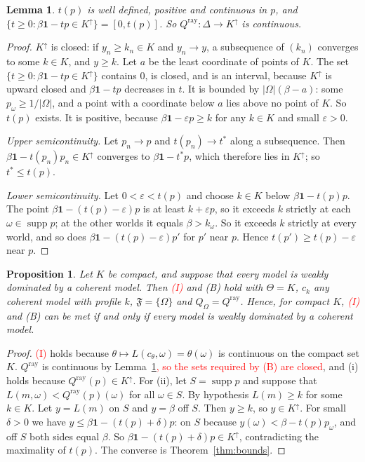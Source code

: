 \documentclass[11pt]{article}
\newtheorem{lemma}[theorem]{Lemma}
\newtheorem{proposition}[theorem]{Proposition}
\theoremstyle{definition}
\theoremstyle{remark}
\newcommand{\F}{\mathfrak F}
\newcommand{\one}{\mathbf 1}
\newcommand{\supp}{\operatorname{supp}}
\begin{document}
\begin{lemma}\label{lem:ray}
$t(p)$ is well defined, positive and continuous in $p$, and $\{t\ge0:\beta\one-tp\in K^\uparrow\}=[0,t(p)]$. So $Q^{\mathrm{ray}}:\Delta\to K^\uparrow$ is continuous.
\end{lemma}
\begin{proof}
$K^\uparrow$ is closed: if $y_n\ge k_n\in K$ and $y_n\to y$, a subsequence of $(k_n)$ converges to some $k\in K$, and $y\ge k$. Let $a$ be the least coordinate of points of $K$. The set $\{t\ge0:\beta\one-tp\in K^\uparrow\}$ contains $0$, is closed, and is an interval, because $K^\uparrow$ is upward closed and $\beta\one-tp$ decreases in $t$. It is bounded by $|\Omega|(\beta-a)$: some $p_\omega\ge1/|\Omega|$, and a point with a coordinate below $a$ lies above no point of $K$. So $t(p)$ exists. It is positive, because $\beta\one-\varepsilon p\ge k$ for any $k\in K$ and small $\varepsilon>0$.

\emph{Upper semicontinuity.} Let $p_n\to p$ and $t(p_n)\to t^*$ along a subsequence. Then $\beta\one-t(p_n)p_n\in K^\uparrow$ converges to $\beta\one-t^*p$, which therefore lies in $K^\uparrow$; so $t^*\le t(p)$.

\emph{Lower semicontinuity.} Let $0<\varepsilon<t(p)$ and choose $k\in K$ below $\beta\one-t(p)p$. The point $\beta\one-(t(p)-\varepsilon)p$ is at least $k+\varepsilon p$, so it exceeds $k$ strictly at each $\omega\in\supp p$; at the other worlds it equals $\beta>k_\omega$. So it exceeds $k$ strictly at every world, and so does $\beta\one-(t(p)-\varepsilon)p'$ for $p'$ near $p$. Hence $t(p')\ge t(p)-\varepsilon$ near $p$.
\end{proof}

\begin{proposition}\label{prop:necessary}
Let $K$ be compact, and suppose that every model is weakly dominated by a coherent model. Then \textcolor{red}{(I)} and (B) hold with $\Theta=K$, $c_k$ any coherent model with profile $k$, $\F=\{\Omega\}$ and $Q_\Omega=Q^{\mathrm{ray}}$. Hence, for compact $K$, \textcolor{red}{(I)} and (B) can be met if and only if every model is weakly dominated by a coherent model.
\end{proposition}
\begin{proof}
\textcolor{red}{(I)} holds because $\theta\mapsto L(c_\theta,\omega)=\theta(\omega)$ is continuous on the compact set $K$. $Q^{\mathrm{ray}}$ is continuous by Lemma~\ref{lem:ray}\textcolor{red}{, so the sets required by (B) are closed}, and (i) holds because $Q^{\mathrm{ray}}(p)\in K^\uparrow$. For (ii), let $S=\supp p$ and suppose that $L(m,\omega)<Q^{\mathrm{ray}}(p)(\omega)$ for all $\omega\in S$. By hypothesis $L(m)\ge k$ for some $k\in K$. Let $y=L(m)$ on $S$ and $y=\beta$ off $S$. Then $y\ge k$, so $y\in K^\uparrow$. For small $\delta>0$ we have $y\le \beta\one-(t(p)+\delta)p$: on $S$ because $y(\omega)<\beta-t(p)p_\omega$, and off $S$ both sides equal $\beta$. So $\beta\one-(t(p)+\delta)p\in K^\uparrow$, contradicting the maximality of $t(p)$. The converse is Theorem~\ref{thm:bounds}.
\end{proof}
\end{document}
